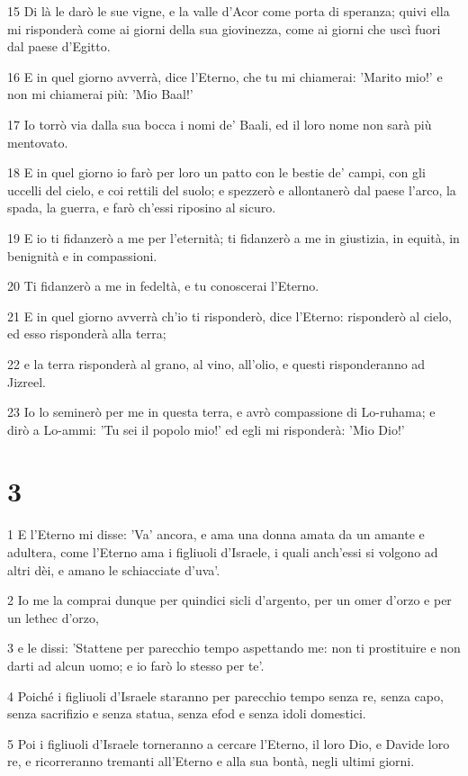 \par 15 Di là le darò le sue vigne, e la valle d'Acor come porta di speranza; quivi ella mi risponderà come ai giorni della sua giovinezza, come ai giorni che uscì fuori dal paese d'Egitto.
\par 16 E in quel giorno avverrà, dice l'Eterno, che tu mi chiamerai: 'Marito mio!' e non mi chiamerai più: 'Mio Baal!'
\par 17 Io torrò via dalla sua bocca i nomi de' Baali, ed il loro nome non sarà più mentovato.
\par 18 E in quel giorno io farò per loro un patto con le bestie de' campi, con gli uccelli del cielo, e coi rettili del suolo; e spezzerò e allontanerò dal paese l'arco, la spada, la guerra, e farò ch'essi riposino al sicuro.
\par 19 E io ti fidanzerò a me per l'eternità; ti fidanzerò a me in giustizia, in equità, in benignità e in compassioni.
\par 20 Ti fidanzerò a me in fedeltà, e tu conoscerai l'Eterno.
\par 21 E in quel giorno avverrà ch'io ti risponderò, dice l'Eterno: risponderò al cielo, ed esso risponderà alla terra;
\par 22 e la terra risponderà al grano, al vino, all'olio, e questi risponderanno ad Jizreel.
\par 23 Io lo seminerò per me in questa terra, e avrò compassione di Lo-ruhama; e dirò a Lo-ammi: 'Tu sei il popolo mio!' ed egli mi risponderà: 'Mio Dio!'

\chapter{3}

\par 1 E l'Eterno mi disse: 'Va' ancora, e ama una donna amata da un amante e adultera, come l'Eterno ama i figliuoli d'Israele, i quali anch'essi si volgono ad altri dèi, e amano le schiacciate d'uva'.
\par 2 Io me la comprai dunque per quindici sicli d'argento, per un omer d'orzo e per un lethec d'orzo,
\par 3 e le dissi: 'Stattene per parecchio tempo aspettando me: non ti prostituire e non darti ad alcun uomo; e io farò lo stesso per te'.
\par 4 Poiché i figliuoli d'Israele staranno per parecchio tempo senza re, senza capo, senza sacrifizio e senza statua, senza efod e senza idoli domestici.
\par 5 Poi i figliuoli d'Israele torneranno a cercare l'Eterno, il loro Dio, e Davide loro re, e ricorreranno tremanti all'Eterno e alla sua bontà, negli ultimi giorni.

